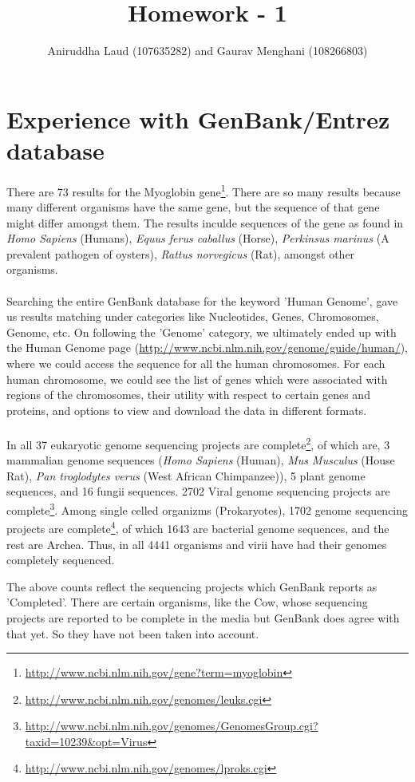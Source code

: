 \documentclass{article}
\title{Homework - 1}
\author{Aniruddha Laud (107635282) and Gaurav Menghani (108266803)}
\begin{document}
\maketitle

\clearpage


\section{Experience with GenBank/Entrez database}
There are 73 results for the Myoglobin gene\footnote{\url{http://www.ncbi.nlm.nih.gov/gene?term=myoglobin}}. There are so many results because many different organisms have the same gene, but the sequence of that gene might differ amongst them.
The results inculde sequences of the gene as found in \textit{Homo Sapiens} (Humans), \textit{Equus ferus caballus} (Horse), \textit{Perkinsus marinus} (A prevalent pathogen of oysters), \textit{Rattus norvegicus} (Rat), amongst other organisms.\\
\\
Searching the entire GenBank database for the keyword 'Human Genome', gave us results matching under categories like Nucleotides, Genes, Chromosomes, Genome, etc. On following the 'Genome' category, we ultimately ended up with the Human Genome page (\url{http://www.ncbi.nlm.nih.gov/genome/guide/human/}), where we could access the sequence for all the human chromosomes. For each human chromosome, we could see the list of genes which were associated with regions of the chromosomes, their utility with respect to certain genes and proteins, and options to view and download the data in different formats.\\
\\
In all 37 eukaryotic genome sequencing projects are complete\footnote{\url{http://www.ncbi.nlm.nih.gov/genomes/leuks.cgi}}, of which are, 3 mammalian genome sequences (\textit{Homo Sapiens} (Human), \textit{Mus Musculus} (House Rat), \textit{Pan troglodytes verus} (West African Chimpanzee)), 5 plant genome sequences, and 16 fungii sequences. 2702 Viral genome sequencing projects are complete\footnote{\url{http://www.ncbi.nlm.nih.gov/genomes/GenomesGroup.cgi?taxid=10239&opt=Virus}}. Among single celled organizms (Prokaryotes), 1702 genome sequencing projects are complete\footnote{\url{http://www.ncbi.nlm.nih.gov/genomes/lproks.cgi}}, of which 1643 are bacterial genome sequences, and the rest are Archea. Thus, in all 4441 organisms and virii have had their genomes completely sequenced.

The above counts reflect the sequencing projects which GenBank reports as 'Completed'. There are certain organisms, like the Cow, whose sequencing projects are reported to be complete in the media but GenBank does agree with that yet. So they have not been taken into account.
\clearpage
\end{document}

